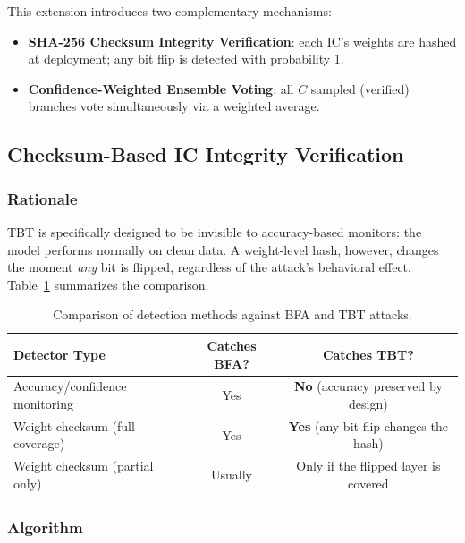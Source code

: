 \documentclass[12pt,a4paper]{article}
\newcommand{\tbt}{\textsc{TBT}}
\newcommand{\ic}{\textsc{IC}}
\begin{document}
This extension introduces two complementary mechanisms:
\begin{itemize}
    \item \textbf{SHA-256 Checksum Integrity Verification}: each \ic{}'s weights are hashed at deployment; any bit flip is detected with probability 1.
    \item \textbf{Confidence-Weighted Ensemble Voting}: all $C$ sampled (verified) branches vote simultaneously via a weighted average.
\end{itemize}

\subsection{Checksum-Based IC Integrity Verification}

\subsubsection{Rationale}

\tbt{} is specifically designed to be invisible to accuracy-based monitors: the model performs normally on clean data. A weight-level hash, however, changes the moment \emph{any} bit is flipped, regardless of the attack's behavioral effect. Table~\ref{tab:detector_comparison} summarizes the comparison.

\begin{table}[H]
    \centering
    \caption{Comparison of detection methods against BFA and TBT attacks.}
    \label{tab:detector_comparison}
    \begin{tabular}{lcc}
        \toprule
        \textbf{Detector Type} & \textbf{Catches BFA?} & \textbf{Catches TBT?} \\
        \midrule
        Accuracy/confidence monitoring & Yes & \textbf{No} (accuracy preserved by design) \\
        Weight checksum (full coverage) & Yes & \textbf{Yes} (any bit flip changes the hash) \\
        Weight checksum (partial only)  & Usually & Only if the flipped layer is covered \\
        \bottomrule
    \end{tabular}
\end{table}

\subsubsection{Algorithm}
\end{document}
